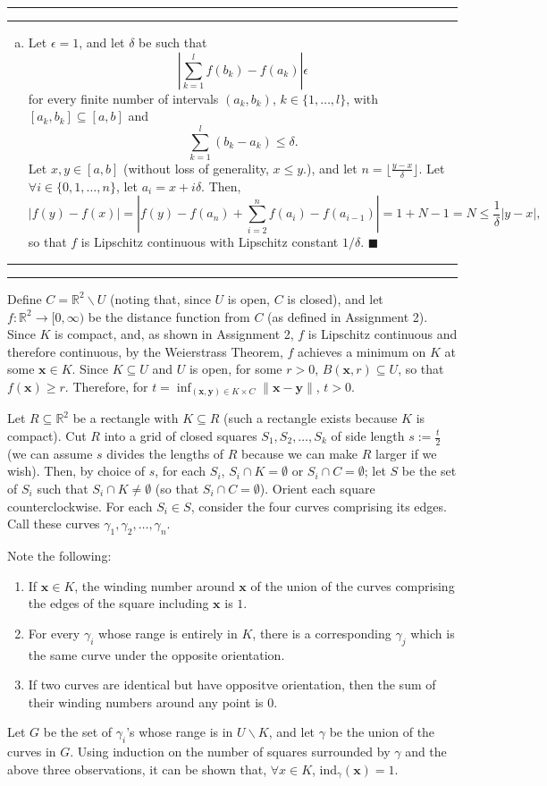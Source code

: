 \documentclass[11pt]{article}
\newcounter{questionCounter}
\newcounter{partCounter}[questionCounter]
\newenvironment{question}[2][\arabic{questionCounter}]{%
    \setcounter{partCounter}{0}%
    \vspace{.25in} \hrule \vspace{0.5em}%
        \noindent{\bf #2}%
    \vspace{0.8em} \hrule \vspace{.10in}%
    \addtocounter{questionCounter}{1}%
}{}
\begin{document}
\begin{question}{Problem 1}
\begin{enumerate}[(a)]
\item Let $\epsilon = 1$, and let $\delta$ be such that
\[\left| \sum_{k = 1}^l f(b_k) - f(a_k) \right| \epsilon\]
for every finite number of intervals $(a_k,b_k)$, $k \in \{1,\ldots,l\}$,
with $[a_k,b_k] \subseteq [a,b]$ and
\[\sum_{k = 1}^l (b_k - a_k) \leq \delta.\]
Let $x,y \in [a,b]$ (without loss of generality, $x \leq y$.), and let
$n = \lfloor \frac{y - x}{\delta}\rfloor$. Let
$\forall i \in \{0,1,\ldots,n\}$, let $a_i = x + i\delta$. Then,
\[|f(y) - f(x)|
 = \left|f(y) - f(a_n) + \sum_{i = 2}^{n} f(a_i) - f(a_{i - 1}) \right|
 = 1 + N - 1 = N \leq \frac{1}{\delta}|y - x|,\]
so that $f$ is Lipschitz continuous with Lipschitz constant $1/\delta$.
\quad $\blacksquare$
\end{enumerate}
\end{question}
\newpage
\begin{question}{Problem 2}
Define $C = \mathbb{R}^2 \backslash U$ (noting that, since $U$ is open,
$C$ is closed), and let $f:\mathbb{R}^2 \rightarrow [0,\infty)$ be the
distance function from $C$ (as defined in Assignment 2). Since $K$ is compact,
and, as shown in Assignment 2, $f$ is Lipschitz continuous and therefore
continuous, by the Weierstrass Theorem, $f$ achieves a minimum on $K$ at some
$\mathbf{x} \in K$. Since $K \subseteq U$ and $U$ is open, for some
$r > 0$, $B(\mathbf{x},r) \subseteq U$, so that $f(\mathbf{x}) \geq r$.
Therefore, for
$t = \inf_{(\mathbf{x},\mathbf{y}) \in K \times C} \|\mathbf{x} - \mathbf{y}\|$,
$t > 0$.

Let $R \subseteq \mathbb{R}^2$ be a rectangle with $K \subseteq R$
(such a rectangle exists because $K$ is compact). Cut $R$ into a grid of
closed squares $S_1,S_2,\ldots,S_k$ of side length $s := \frac{t}{2}$ (we can
assume $s$ divides the lengths of $R$ because we can make $R$ larger if we
wish). Then, by choice of $s$, for each $S_i$, $S_i \cap K = \emptyset$ or
$S_i \cap C = \emptyset$; let $S$ be the set of $S_i$ such that
$S_i \cap K \neq \emptyset$ (so that $S_i \cap C = \emptyset$). Orient each
square counterclockwise. For each $S_i \in S$, consider the four curves
comprising its edges. Call these curves $\gamma_1,\gamma_2,\ldots,\gamma_n$.

Note the following:
\begin{enumerate}[1.]
\item If $\mathbf{x} \in K$, the winding number around $\mathbf{x}$ of the
union of the curves comprising the edges of the square including $\mathbf{x}$
is $1$.
\item For every $\gamma_i$ whose range is entirely in $K$, there is a
corresponding $\gamma_j$ which is the same curve under the opposite
orientation.
\item If two curves are identical but have oppositve orientation, then the sum
of their winding numbers around any point is $0$.
\end{enumerate}
Let $G$ be the set of $\gamma_i$'s whose range is in $U \backslash K$,
and let $\gamma$ be the union of the curves in $G$. Using induction on the
number of squares surrounded by $\gamma$ and the above three observations, it
can be shown that, $\forall x \in K$, ind$_{\gamma}(\mathbf{x}) = 1$.


\end{question}
\end{document}
